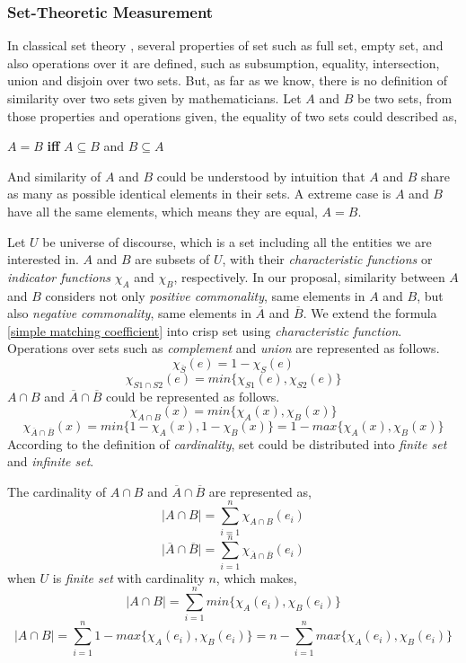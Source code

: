 \subsubsection{Set-Theoretic Measurement}
\label{sec:Set Theory}
In classical set theory \cite{ST80}, several properties of set such as full set, empty set, and also operations over it are defined, such as subsumption, equality, intersection, union and disjoin over two sets. But, as far as we know, there is no definition of similarity over two sets given by mathematicians. Let $A$ and $B$ be two sets, from those properties and operations given, the equality of two sets could described as,
\begin{center}
$A = B$ \textbf{iff} $A \subseteq B$ and $B \subseteq A$
\end{center}
And similarity of $A$ and $B$ could be understood by intuition that $A$ and $B$ share as many as possible identical elements in their sets. A extreme case is $A$ and $B$ have all the same elements, which means they are equal, $A = B$.

Let $U$ be universe of discourse, which is a set including all the entities we are interested in. $A$ and $B$ are subsets of $U$, with their \textit{characteristic functions} or \textit{indicator functions} $\chi_{A}$ and $\chi_{B}$, respectively.
In our proposal, similarity between $A$ and $B$ considers not only \textit{positive commonality}, same elements in $A$ and $B$, 
but also \textit{negative commonality}, same elements in $\overline{A}$ and $\overline{B}$. We extend the formula \eqref{simple matching coefficient} into crisp set using \textit{characteristic function}. Operations over sets such as \textit{complement} and \textit{union} are represented as follows.
\[\chi_{\overline{S}}(e)=1-\chi_{S}(e)\]
\[\chi_{S1 \cap S2}(e)=min\{\chi_{S1}(e), \chi_{S2}(e)\}\]
$A \cap B$ and $\overline{A} \cap \overline{B}$ could be represented as follows.
\[\chi_{A \cap B}(x)=min\{\chi_{A}(x), \chi_{B}(x)\}\]
\[\chi_{\overline{A} \cap \overline{B}}(x)=min\{1-\chi_{A}(x), 1-\chi_{B}(x)\}=1-max\{\chi_{A}(x), \chi_{B}(x)\}\]
According to the definition of \textit{cardinality}, set could be distributed into \textit{finite set} and \textit{infinite set}.  

The cardinality of $A \cap B$ and $\overline{A} \cap \overline{B}$ are represented as,
\[\lvert A \cap B \rvert = \sum_{i=1}^{n} \chi_{A \cap B}(e_i)\]
\[\lvert \overline{A} \cap \overline{B} \rvert = \sum_{i=1}^{n} \chi_{\overline{A} \cap \overline{B}}(e_i)\]
when $U$ is \textit{finite set} with cardinality $n$, which makes,
\begin{equation}\label{positive}
\lvert A \cap B \rvert = \sum_{i=1}^{n} min\{\chi_{A}(e_i), \chi_{B}(e_i)\}
\end{equation}
\begin{equation}\label{negative}
\lvert A \cap B \rvert = \sum_{i=1}^{n} 1-max\{\chi_{A}(e_i), \chi_{B}(e_i)\}=n-\sum_{i=1}^{n} max\{\chi_{A}(e_i), \chi_{B}(e_i)\}
\end{equation}

